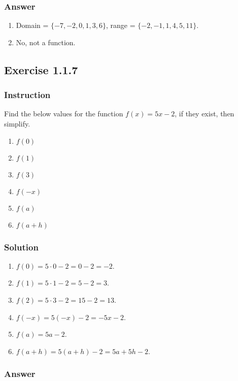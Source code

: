 \documentclass[11pt, letterpaper, oneside]{memoir}
\begin{document}
\subsubsection{Answer}

\begin{enumerate}[label=(\alph*)]
  \item Domain = $  \{ -7, -2, 0, 1, 3, 6 \} $, range = $ \{ -2, -1, 1, 4, 5, 11\} $.
  \item No, not a function.
\end{enumerate}

\subsection*{Exercise 1.1.7}

\subsubsection{Instruction}

Find the below values for the function $ f(x) = 5x - 2 $, if they exist, then simplify.
\begin{enumerate}[label=(\alph*)]
  \item $ f(0) $
  \item $ f(1) $
  \item $ f(3) $
  \item $ f(-x) $
  \item $ f(a) $
  \item $ f(a + h) $
\end{enumerate}

\subsubsection{Solution}

\begin{enumerate}[label=(\alph*)]
  \item $ f(0) = 5 \cdot 0 - 2 = 0 - 2 = -2 $.
  \item $ f(1) = 5 \cdot 1 - 2 = 5 - 2 = 3 $.
  \item $ f(2) = 5 \cdot 3 - 2 = 15 - 2 = 13 $.
  \item $ f(-x) = 5(-x) - 2 = -5x - 2 $.
  \item $ f(a) = 5a - 2 $.
  \item $ f(a + h) = 5(a + h) - 2 = 5a + 5h - 2 $.
\end{enumerate}

\subsubsection{Answer}
\end{document}
